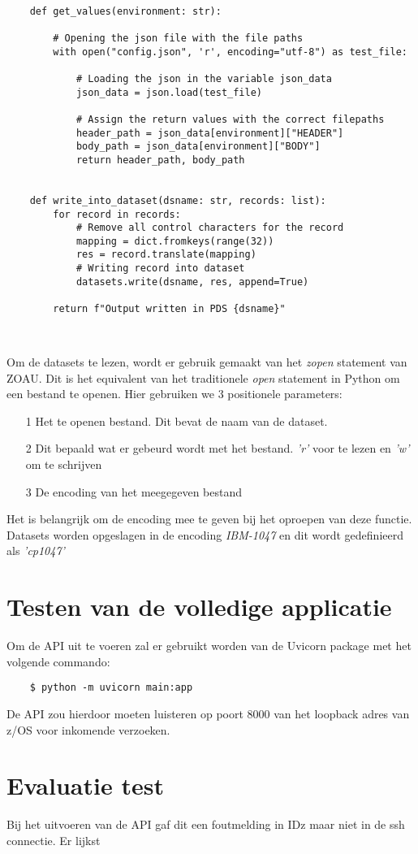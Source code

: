 \begin{lstlisting}
    
    def get_values(environment: str):
    
        # Opening the json file with the file paths 
        with open("config.json", 'r', encoding="utf-8") as test_file:
        
            # Loading the json in the variable json_data
            json_data = json.load(test_file)
            
            # Assign the return values with the correct filepaths
            header_path = json_data[environment]["HEADER"]
            body_path = json_data[environment]["BODY"] 
            return header_path, body_path
    
    
    def write_into_dataset(dsname: str, records: list):
        for record in records:
            # Remove all control characters for the record
            mapping = dict.fromkeys(range(32))
            res = record.translate(mapping)
            # Writing record into dataset
            datasets.write(dsname, res, append=True)
            
        return f"Output written in PDS {dsname}"
    
    
\end{lstlisting}
\vspace{10 mm}
Om de datasets te lezen, wordt er gebruik gemaakt van het \textit{zopen} statement van ZOAU. Dit is het equivalent van het traditionele \textit{open} statement in Python om een bestand te openen. Hier gebruiken we 3 positionele parameters: 
\begin{itemize}
    \item[1] Het te openen bestand. Dit bevat de naam van de dataset.
    \item[2] Dit bepaald wat er gebeurd wordt met het bestand. \textit{'r'} voor te lezen en \textit{'w'} om te schrijven
    \item[3] De encoding van het meegegeven bestand
\end{itemize} 
Het is belangrijk om de encoding mee te geven bij het oproepen van deze functie. Datasets worden opgeslagen in de encoding \textit{IBM-1047} en dit wordt gedefinieerd als \textit{'cp1047'}


\chapter{Testen van de volledige applicatie}
\label{ch:test-app}
Om de API uit te voeren zal er gebruikt worden van de Uvicorn package met het volgende commando:

\begin{lstlisting}
    $ python -m uvicorn main:app
\end{lstlisting}

De API zou hierdoor moeten luisteren op poort 8000 van het loopback adres van z/OS voor inkomende verzoeken. 


\chapter{Evaluatie test}
\label{ch:eval-test}
Bij het uitvoeren van de API gaf dit een foutmelding in IDz maar niet in de ssh connectie. Er lijkst







